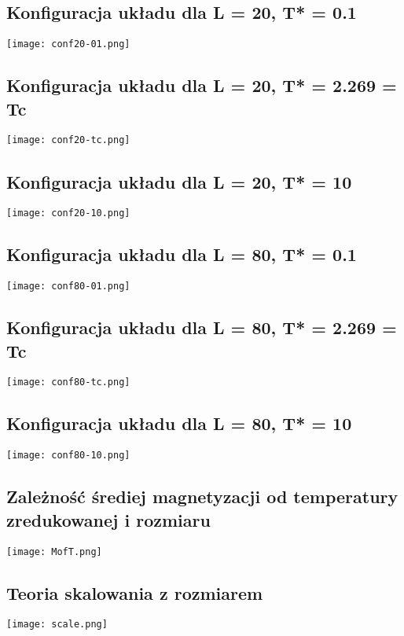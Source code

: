 \documentclass{article}
\begin{document}
\subsection{Konfiguracja układu dla L = 20, T* = 0.1}
\texttt{[image: conf20-01.png]}
\subsection{Konfiguracja układu dla L = 20, T* = 2.269 = Tc}
\texttt{[image: conf20-tc.png]}
\subsection{Konfiguracja układu dla L = 20, T* = 10}
\texttt{[image: conf20-10.png]}

\subsection{Konfiguracja układu dla L = 80, T* = 0.1}
\texttt{[image: conf80-01.png]}
\subsection{Konfiguracja układu dla L = 80, T* = 2.269 = Tc}
\texttt{[image: conf80-tc.png]}
\subsection{Konfiguracja układu dla L = 80, T* = 10}
\texttt{[image: conf80-10.png]}

\subsection{Zależność średiej magnetyzacji od temperatury zredukowanej i rozmiaru}
\texttt{[image: MofT.png]}

\subsection{Teoria skalowania z rozmiarem}
\texttt{[image: scale.png]}
\end{document}
